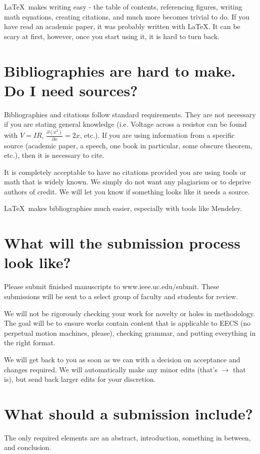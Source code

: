 \documentclass[12pt]{article}
\begin{document}
\LaTeX\ makes writing easy - the table of contents, referencing figures, writing math equations, creating citations, and much more becomes trivial to do. If you have read an academic paper, it was probably written with \LaTeX. It can be scary at first, however, once you start using it, it is hard to turn back.

\section{Bibliographies are hard to make. Do I need sources?}
Bibliographies and citations follow standard requirements. They are not necessary if you are stating general knowledge (i.e. Voltage across a resistor can be found with $V = IR$, $\frac{\partial (x^2)}{\partial x} = 2x $, etc.). If you are using information from a specific source (academic paper, a speech, one book in particular, some obscure theorem, etc.), then it is necessary to cite. 

It is completely acceptable to have no citations provided you are using tools or math that is widely known. We simply do not want any plagiarism or to deprive authors of credit. We will let you know if something looks like it needs a source.

\LaTeX\ makes bibliographies much easier, especially with tools like Mendeley.

\section{What will the submission process look like?}

Please submit finished manuscripts to www.ieee.uc.edu/submit. These submissions will be sent to a select group of faculty and students for review. 

We will not be rigorously checking your work for novelty or holes in methodology. The goal will be to ensure works contain content that is applicable to EECS (no perpetual motion machines, please), checking grammar, and putting everything in the right format.

We will get back to you as soon as we can with a decision on acceptance and changes required. We will automatically make any minor edits (that's $\rightarrow$ that is), but send back larger edits for your discretion. 

\section{What should a submission include?}
The only required elements are an abstract, introduction, something in between, and conclusion.
\end{document}
